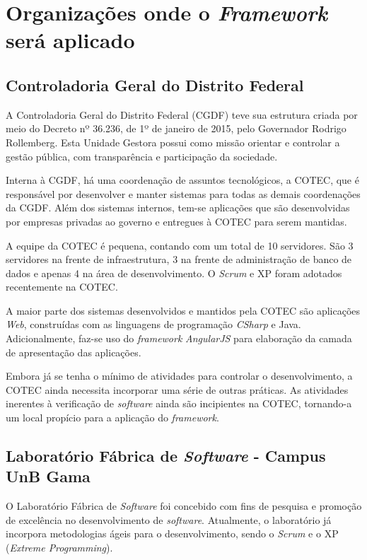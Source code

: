 \section{Organizações onde o \textit{Framework} será aplicado}

\subsection{Controladoria Geral do Distrito Federal}

A Controladoria Geral do Distrito Federal (CGDF) teve sua estrutura criada por meio do Decreto nº 36.236, de 1º de janeiro de 2015, pelo Governador Rodrigo Rollemberg. Esta Unidade Gestora possui como missão orientar e controlar a gestão pública, com transparência e participação da sociedade.

Interna à CGDF, há uma coordenação de assuntos tecnológicos, a COTEC, que é responsável por desenvolver e manter sistemas para todas as demais coordenações da CGDF. Além dos sistemas internos, tem-se aplicações que são desenvolvidas por empresas privadas ao governo e entregues à COTEC para serem mantidas.

A equipe da COTEC é pequena, contando com um total de 10 servidores. São 3 servidores na frente de infraestrutura, 3 na frente de administração de banco de dados e apenas 4 na área de desenvolvimento. O \textit{Scrum} e XP foram adotados recentemente na COTEC.

A maior parte dos sistemas desenvolvidos e mantidos pela COTEC são aplicações \textit{Web}, construídas com as linguagens de programação \textit{CSharp} e Java. Adicionalmente, faz-se uso do \textit{framework} \textit{AngularJS} para elaboração da camada de apresentação das aplicações.

Embora já se tenha o mínimo de atividades para controlar o desenvolvimento, a COTEC ainda necessita incorporar uma série de outras práticas. As atividades inerentes à verificação de \textit{software} ainda são incipientes na COTEC, tornando-a um local propício para a aplicação do \textit{framework}.

\subsection{Laboratório Fábrica de \textit{Software} - Campus UnB Gama}

O Laboratório Fábrica de \textit{Software} foi concebido com fins de pesquisa e promoção de excelência no desenvolvimento de \textit{software}. Atualmente, o laboratório já incorpora metodologias ágeis para o desenvolvimento, sendo o \textit{Scrum} e o XP (\textit{Extreme Programming}).

